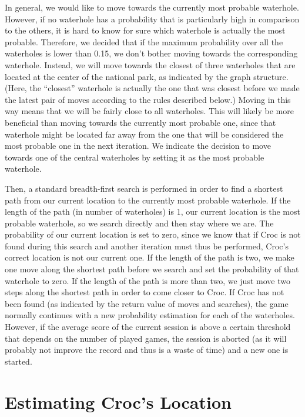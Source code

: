 \documentclass[a4paper]{article}
\begin{document}
In general, we would like to move towards the currently most probable
waterhole. However, if no waterhole has a probability that is particularly high in comparison to the others, it is hard to
know for sure which waterhole is actually the most probable. Therefore, we
decided that if the maximum probability over all the waterholes is lower than 0.15, we don't bother
moving towards the corresponding waterhole. Instead, we will move towards
the closest of three waterholes that are
located at the center of the national 
park, as indicated by the graph structure. (Here, the ``closest'' waterhole is
actually the one that was closest before we made the latest pair of moves
according to the rules described below.) Moving in this way means that we will be fairly
close to all waterholes. This will likely be more beneficial than moving
towards the currently most probable one, since that waterhole might be located
far away from the one that will be considered the most probable one in the
next iteration. We indicate the decision to
move towards one of the central waterholes by setting it as the most probable
waterhole.

Then, a standard breadth-first search is performed in order to find a shortest path
from our current location to the currently most probable waterhole. If the
length of the path (in number of waterholes) is 1, our current location is the
most probable waterhole, so we search directly and then stay where we are. The probability of our current
location is set to zero, since we know that if Croc is not found during this
search and another iteration must thus be performed, Croc's correct location
is not our current one. If the length of the path is two, we make one move
along the shortest path before we search and set the probability of that
waterhole to zero. If the length of the path is more than two, we just move
two steps along the shortest path in order to come closer to Croc. If Croc has
not been found (as indicated by the return value of moves and searches), the
game normally continues with a new probability estimation for each of the
waterholes. However, if the
average score of the current session is above a certain threshold that
depends on the number of played games, the session is aborted (as it will
probably not improve the record and thus is a waste of time) and a new one is started.

\section{Estimating Croc's Location}
\label{locate}
\end{document}
